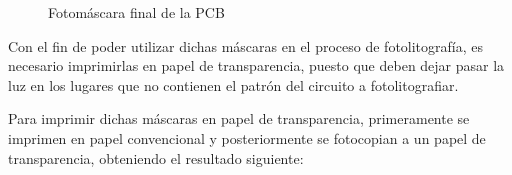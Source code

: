 \begin{itemize}
     \begin{figure}[H]
    \centering
    \caption{Fotomáscara final de la \ac{PCB}} \label{fig:lego}
    \end{figure}
    
   Con el fin de poder utilizar dichas máscaras en el proceso de fotolitografía, es necesario imprimirlas en papel de transparencia, puesto que deben dejar pasar la luz en los lugares que no contienen el patrón del circuito a fotolitografiar.
   
   Para imprimir dichas máscaras en papel de transparencia, primeramente se imprimen en papel convencional y posteriormente se fotocopian a un papel de transparencia, obteniendo el resultado siguiente:
   

\end{itemize}
